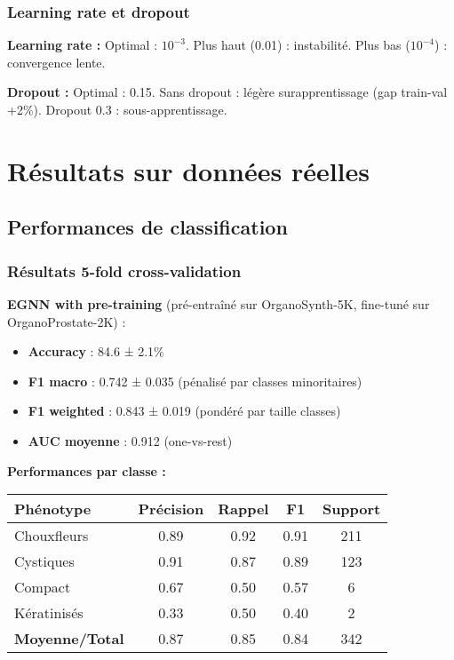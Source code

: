 \subsubsection{Learning rate et dropout}

\textbf{Learning rate :}
Optimal : $10^{-3}$. Plus haut (0.01) : instabilité. Plus bas ($10^{-4}$) : convergence lente.

\textbf{Dropout :}
Optimal : 0.15. Sans dropout : légère surapprentissage (gap train-val +2\%). Dropout 0.3 : sous-apprentissage.

\section{Résultats sur données réelles}

\subsection{Performances de classification}

\subsubsection{Résultats 5-fold cross-validation}

\textbf{EGNN with pre-training} (pré-entraîné sur OrganoSynth-5K, fine-tuné sur OrganoProstate-2K) :
\begin{itemize}
    \item \textbf{Accuracy} : 84.6 ± 2.1\%
    \item \textbf{F1 macro} : 0.742 ± 0.035 (pénalisé par classes minoritaires)
    \item \textbf{F1 weighted} : 0.843 ± 0.019 (pondéré par taille classes)
    \item \textbf{AUC moyenne} : 0.912 (one-vs-rest)
\end{itemize}

\textbf{Performances par classe :}
\begin{center}
\begin{tabular}{|l|c|c|c|c|}
\hline
\textbf{Phénotype} & \textbf{Précision} & \textbf{Rappel} & \textbf{F1} & \textbf{Support} \\
\hline
Chouxfleurs & 0.89 & 0.92 & 0.91 & 211 \\
Cystiques & 0.91 & 0.87 & 0.89 & 123 \\
Compact & 0.67 & 0.50 & 0.57 & 6 \\
Kératinisés & 0.33 & 0.50 & 0.40 & 2 \\
\hline
\textbf{Moyenne/Total} & 0.87 & 0.85 & 0.84 & 342 \\
\hline
\end{tabular}
\end{center}

